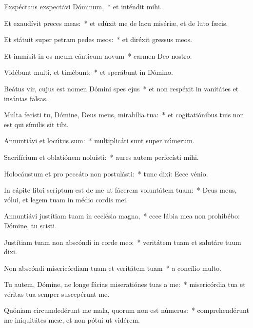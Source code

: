 \item Exspéctans exspectávi Dóminum,~* et inténdit mihi.

\item Et exaudívit preces meas:~* et edúxit me de lacu misériæ, et de luto fæcis.

\item Et státuit super petram pedes meos:~* et diréxit gressus meos.

\item Et immísit in os meum cánticum novum~* carmen Deo nostro.

\item Vidébunt multi, et timébunt:~* et sperábunt in Dómino.

\item Beátus vir, cujus est nomen Dómini spes ejus~* et non respéxit in vanitátes et insánias falsas.

\item Multa fecísti tu, Dómine, Deus meus, mirabília tua:~* et cogitatiónibus tuis non est qui símilis sit tibi.

\item Annuntiávi et locútus sum:~* multiplicáti sunt super númerum.

\item Sacrifícium et oblatiónem noluísti:~* aures autem perfecísti mihi.

\item Holocáustum et pro peccáto non postulásti:~* tunc dixi: Ecce vénio.

\item In cápite libri scriptum est de me ut fácerem voluntátem tuam:~* Deus meus, vólui, et legem tuam in médio cordis mei.

\item Annuntiávi justítiam tuam in ecclésia magna,~* ecce lábia mea non prohibébo: Dómine, tu scisti.

\item Justítiam tuam non abscóndi in corde meo:~* veritátem tuam et salutáre tuum dixi.

\item Non abscóndi misericórdiam tuam et veritátem tuam~* a concílio multo.

\item Tu autem, Dómine, ne longe fácias miseratiónes tuas a me:~* misericórdia tua et véritas tua semper suscepérunt me.

\item Quóniam circumdedérunt me mala, quorum non est númerus:~* comprehendérunt me iniquitátes meæ, et non pótui ut vidérem.

